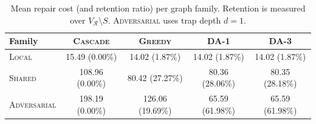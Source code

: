 \begin{table}[t]
\centering
\small
\caption{Mean repair cost (and retention ratio) per graph family. Retention is measured over $V_{\mathcal R}\setminus S$. \textsc{Adversarial} uses trap depth $d=1$.}
\label{tab:families}
\begin{tabular}{lcccc}
\toprule
Family & \textsc{Cascade} & \textsc{Greedy} & \textsc{DA}-1 & \textsc{DA}-3 \\
\midrule
\textsc{Local} & 15.49 (0.00\%) & 14.02 (1.87\%) & 14.02 (1.87\%) & 14.02 (1.87\%) \\
\textsc{Shared} & 108.96 (0.00\%) & 80.42 (27.27\%) & 80.36 (28.06\%) & 80.35 (28.18\%) \\
\textsc{Adversarial} & 198.19 (0.00\%) & 126.06 (19.69\%) & 65.59 (61.98\%) & 65.59 (61.98\%) \\
\bottomrule
\end{tabular}
\end{table}
